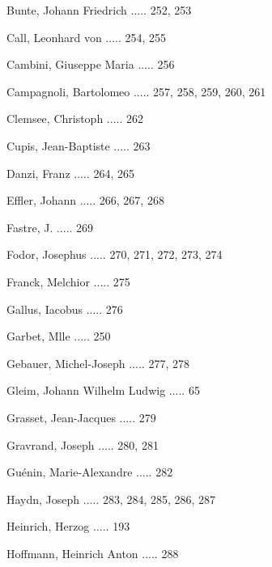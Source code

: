 \documentclass[twocolumn]{book}
\begin{document}
\newline 
Bunte, Johann Friedrich ..... 252, 253

\newline 
Call, Leonhard von ..... 254, 255

\newline 
Cambini, Giuseppe Maria ..... 256

\newline 
Campagnoli, Bartolomeo ..... 257, 258, 259, 260, 261

\newline 
Clemsee, Christoph ..... 262

\newline 
Cupis, Jean-Baptiste ..... 263

\newline 
Danzi, Franz ..... 264, 265

\newline 
Effler, Johann ..... 266, 267, 268

\newline 
Fastre, J. ..... 269

\newline 
Fodor, Josephus ..... 270, 271, 272, 273, 274

\newline 
Franck, Melchior ..... 275

\newline 
Gallus, Iacobus ..... 276

\newline 
Garbet, Mlle ..... 250

\newline 
Gebauer, Michel-Joseph ..... 277, 278

\newline 
Gleim, Johann Wilhelm Ludwig ..... 65

\newline 
Grasset, Jean-Jacques ..... 279

\newline 
Gravrand, Joseph ..... 280, 281

\newline 
Guénin, Marie-Alexandre ..... 282

\newline 
Haydn, Joseph ..... 283, 284, 285, 286, 287

\newline 
Heinrich, Herzog ..... 193

\newline 
Hoffmann, Heinrich Anton ..... 288
\end{document}
